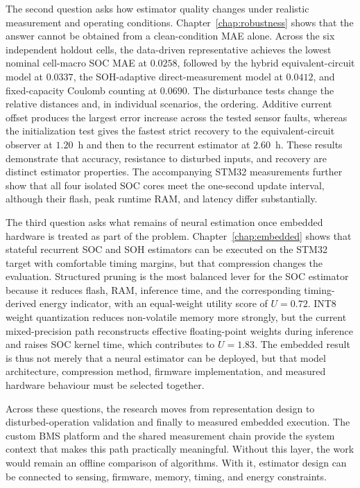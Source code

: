 \documentclass[
    a4paper,
    12pt,
    titlepage,
    bibliography=totoc,
    twoside=on,
    parskip=false,
    numbers=noenddot,
    cleardoublepage=empty,
    DIV=12,
    BCOR=12.0mm,
    headheight=36pt,
    headings=openright
]{scrreprt}
\begin{document}
The second question asks how estimator quality changes under realistic measurement and operating conditions. Chapter~\ref{chap:robustness} shows that the answer cannot be obtained from a clean-condition MAE alone. Across the six independent holdout cells, the data-driven representative achieves the lowest nominal cell-macro SOC MAE at $0.0258$, followed by the hybrid equivalent-circuit model at $0.0337$, the SOH-adaptive direct-measurement model at $0.0412$, and fixed-capacity Coulomb counting at $0.0690$. The disturbance tests change the relative distances and, in individual scenarios, the ordering. Additive current offset produces the largest error increase across the tested sensor faults, whereas the initialization test gives the fastest strict recovery to the equivalent-circuit observer at $1.20$~h and then to the recurrent estimator at $2.60$~h. These results demonstrate that accuracy, resistance to disturbed inputs, and recovery are distinct estimator properties. The accompanying STM32 measurements further show that all four isolated SOC cores meet the one-second update interval, although their flash, peak runtime RAM, and latency differ substantially.

The third question asks what remains of neural estimation once embedded hardware is treated as part of the problem. Chapter~\ref{chap:embedded} shows that stateful recurrent SOC and SOH estimators can be executed on the STM32 target with comfortable timing margins, but that compression changes the evaluation. Structured pruning is the most balanced lever for the SOC estimator because it reduces flash, RAM, inference time, and the corresponding timing-derived energy indicator, with an equal-weight utility score of $U=0.72$. INT8 weight quantization reduces non-volatile memory more strongly, but the current mixed-precision path reconstructs effective floating-point weights during inference and raises SOC kernel time, which contributes to $U=1.83$. The embedded result is thus not merely that a neural estimator can be deployed, but that model architecture, compression method, firmware implementation, and measured hardware behaviour must be selected together.

Across these questions, the research moves from representation design to disturbed-operation validation and finally to measured embedded execution. The custom BMS platform and the shared measurement chain provide the system context that makes this path practically meaningful. Without this layer, the work would remain an offline comparison of algorithms. With it, estimator design can be connected to sensing, firmware, memory, timing, and energy constraints.
\end{document}
